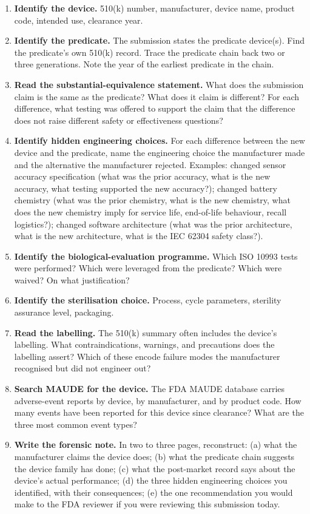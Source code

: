 \begin{project}
\begin{enumerate}[leftmargin=*]
\item \textbf{Identify the device.} 510(k) number, manufacturer,
  device name, product code, intended use, clearance year.
\item \textbf{Identify the predicate.} The submission states the
  predicate device(s). Find the predicate's own 510(k) record.
  Trace the predicate chain back two or three generations. Note
  the year of the earliest predicate in the chain.
\item \textbf{Read the substantial-equivalence statement.} What
  does the submission claim is the same as the predicate? What
  does it claim is different? For each difference, what testing
  was offered to support the claim that the difference does not
  raise different safety or effectiveness questions?
\item \textbf{Identify hidden engineering choices.} For each
  difference between the new device and the predicate, name the
  engineering choice the manufacturer made and the alternative the
  manufacturer rejected. Examples: changed sensor accuracy
  specification (what was the prior accuracy, what is the new
  accuracy, what testing supported the new accuracy?); changed
  battery chemistry (what was the prior chemistry, what is the
  new chemistry, what does the new chemistry imply for service life,
  end-of-life behaviour, recall logistics?); changed software
  architecture (what was the prior architecture, what is the new
  architecture, what is the IEC 62304 safety class?).
\item \textbf{Identify the biological-evaluation programme.} Which
  ISO 10993 tests were performed? Which were leveraged from the
  predicate? Which were waived? On what justification?
\item \textbf{Identify the sterilisation choice.} Process, cycle
  parameters, sterility assurance level, packaging.
\item \textbf{Read the labelling.} The 510(k) summary often includes
  the device's labelling. What contraindications, warnings, and
  precautions does the labelling assert? Which of these encode
  failure modes the manufacturer recognised but did not engineer
  out?
\item \textbf{Search MAUDE for the device.} The FDA MAUDE database
  \cite{web:v6c12-fda-maude-2024} carries adverse-event reports by
  device, by manufacturer, and by product code. How many events
  have been reported for this device since clearance? What are the
  three most common event types?
\item \textbf{Write the forensic note.} In two to three pages,
  reconstruct: (a) what the manufacturer claims the device does;
  (b) what the predicate chain suggests the device family has
  done; (c) what the post-market record says about the device's
  actual performance; (d) the three hidden engineering choices
  you identified, with their consequences; (e) the one
  recommendation you would make to the FDA reviewer if you were
  reviewing this submission today.
\end{enumerate}


\end{project}
